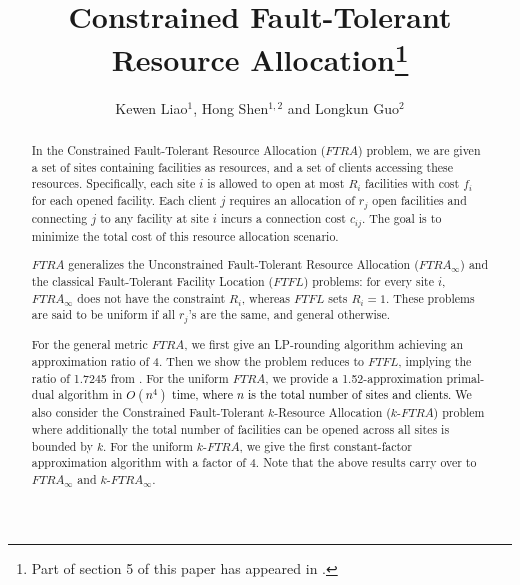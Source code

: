 \documentclass[10pt]{llncs}
\begin{document}
\title{Constrained Fault-Tolerant Resource Allocation\thanks{Part of section 5 of this paper has appeared in \cite{kewen2011cocoon}.}}


\author{\author{Kewen Liao$^1$, Hong Shen$^{1,2}$ and Longkun Guo$^{2}$ }}


\maketitle
\begin{abstract}
In the Constrained Fault-Tolerant Resource Allocation ($FTRA$) problem,
we are given a set of sites containing facilities as resources, and
a set of clients accessing these resources. Specifically, each site
$i$ is allowed to open at most $R_{i}$ facilities with cost $f_{i}$
for each opened facility. Each client $j$ requires an allocation
of $r_{j}$ open facilities and connecting $j$ to any facility at
site $i$ incurs a connection cost $c_{ij}$. The goal is to minimize
the total cost of this resource allocation scenario.

\quad{}\enskip{}$FTRA$ generalizes the Unconstrained Fault-Tolerant
Resource Allocation ($FTRA_{\infty}$) \cite{kewen2011cocoon} and
the classical Fault-Tolerant Facility Location ($FTFL$) \cite{Jain00FTFL}
problems: for every site $i$, $FTRA_{\infty}$ does not have the
constraint $R_{i}$, whereas $FTFL$ sets $R_{i}=1$. These problems
are said to be uniform if all $r_{j}$'s are the same, and general
otherwise.

\quad{}\enskip{}For the general metric $FTRA$, we first give an
LP-rounding algorithm achieving an approximation ratio of 4. Then
we show the problem reduces to $FTFL$, implying the ratio of 1.7245
from \cite{JaroslawFTFL1.725}. For the uniform $FTRA$, we provide
a 1.52-approximation primal-dual algorithm in \textcolor{black}{$O\left(n^{4}\right)$
time, where $n$ is the total number of sites and clients.} We also
consider the Constrained Fault-Tolerant $k$-Resource Allocation ($k$-$FTRA$)
problem where additionally the total number of facilities can be opened
across all sites is bounded by $k$. For the uniform $k$-$FTRA$,
we give the first constant-factor approximation algorithm with a factor
of 4. Note that the above results carry over to $FTRA_{\infty}$ and
$k$-$FTRA_{\infty}$.
\end{abstract}
\thispagestyle{empty}
\end{document}

